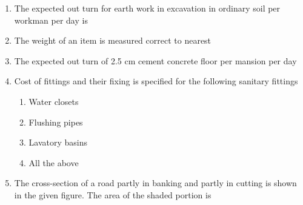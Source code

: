 \documentclass[11pt,a4paper]{article}
\begin{document}
\begin{enumerate}
\item{The expected out turn for earth work in excavation in ordinary soil per workman per day is}
\\
\item{The weight of an item is measured correct to nearest}
\\
\item{The expected out turn of 2.5 cm cement concrete floor per mansion per day}
\\
\item{Cost of fittings and their fixing is specified for the following sanitary fittings}
\begin{enumerate}[label=\Alph*.]
\item{Water closets}
\item{Flushing pipes}
\item{Lavatory basins}
\item{All the above}
\end{enumerate}
\item{The cross-section of a road partly in banking and partly in cutting is shown in the given figure. The area of the shaded portion is \\

}
\end{enumerate}
\end{document}
